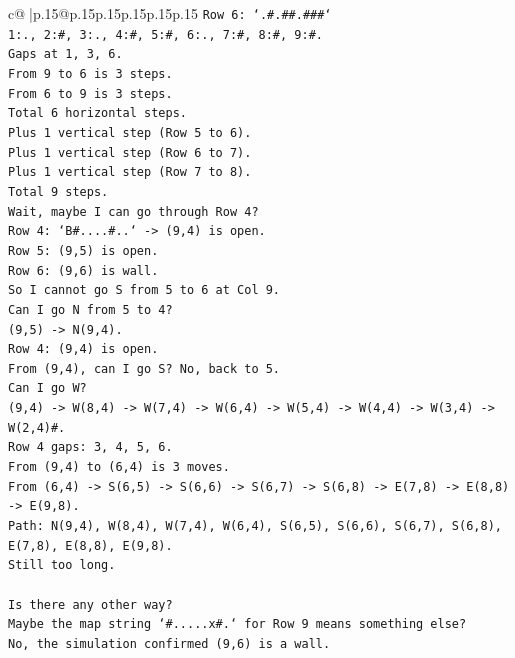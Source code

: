 \documentclass{article}
\begin{document}
{\begin{supertabular}{c@{$\;$}|p{.15\linewidth}@{}p{.15\linewidth}p{.15\linewidth}p{.15\linewidth}p{.15\linewidth}p{.15\linewidth}}
{{{\texttt{Row 6: `.\#.\#\#.\#\#\#`} \\
\texttt{1:., 2:\#, 3:., 4:\#, 5:\#, 6:., 7:\#, 8:\#, 9:\#.} \\
\texttt{Gaps at 1, 3, 6.} \\
\texttt{From 9 to 6 is 3 steps.} \\
\texttt{From 6 to 9 is 3 steps.} \\
\texttt{Total 6 horizontal steps.} \\
\texttt{Plus 1 vertical step (Row 5 to 6).} \\
\texttt{Plus 1 vertical step (Row 6 to 7).} \\
\texttt{Plus 1 vertical step (Row 7 to 8).} \\
\texttt{Total 9 steps.} \\
\texttt{Wait, maybe I can go through Row 4?} \\
\texttt{Row 4: `B\#....\#..` {-}> (9,4) is open.} \\
\texttt{Row 5: (9,5) is open.} \\
\texttt{Row 6: (9,6) is wall.} \\
\texttt{So I cannot go S from 5 to 6 at Col 9.} \\
\texttt{Can I go N from 5 to 4?} \\
\texttt{(9,5) {-}> N(9,4).} \\
\texttt{Row 4: (9,4) is open.} \\
\texttt{From (9,4), can I go S? No, back to 5.} \\
\texttt{Can I go W?} \\
\texttt{(9,4) {-}> W(8,4) {-}> W(7,4) {-}> W(6,4) {-}> W(5,4) {-}> W(4,4) {-}> W(3,4) {-}> W(2,4)\#.} \\
\texttt{Row 4 gaps: 3, 4, 5, 6.} \\
\texttt{From (9,4) to (6,4) is 3 moves.} \\
\texttt{From (6,4) {-}> S(6,5) {-}> S(6,6) {-}> S(6,7) {-}> S(6,8) {-}> E(7,8) {-}> E(8,8) {-}> E(9,8).} \\
\texttt{Path: N(9,4), W(8,4), W(7,4), W(6,4), S(6,5), S(6,6), S(6,7), S(6,8), E(7,8), E(8,8), E(9,8).} \\
\texttt{Still too long.} \\
\\ 
\texttt{Is there any other way?} \\
\texttt{Maybe the map string `\#.....x\#.` for Row 9 means something else?} \\
\texttt{No, the simulation confirmed (9,6) is a wall.} \\
}}}
\end{supertabular}}
\end{document}
